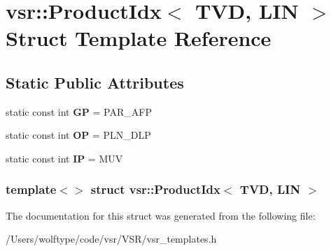 \hypertarget{structvsr_1_1_product_idx_3_01_t_v_d_00_01_l_i_n_01_4}{\section{vsr\-:\-:Product\-Idx$<$ T\-V\-D, L\-I\-N $>$ Struct Template Reference}
\label{structvsr_1_1_product_idx_3_01_t_v_d_00_01_l_i_n_01_4}
}
\subsection*{Static Public Attributes}
\begin{DoxyCompactItemize}
\item 
\hypertarget{structvsr_1_1_product_idx_3_01_t_v_d_00_01_l_i_n_01_4_a6b02df5757f8b860d906bdd7bb7ca5d2}{static const int {\bfseries G\-P} = P\-A\-R\-\_\-\-A\-F\-P}\label{structvsr_1_1_product_idx_3_01_t_v_d_00_01_l_i_n_01_4_a6b02df5757f8b860d906bdd7bb7ca5d2}

\item 
\hypertarget{structvsr_1_1_product_idx_3_01_t_v_d_00_01_l_i_n_01_4_a110243055e9d209b702a1c4c2aca1720}{static const int {\bfseries O\-P} = P\-L\-N\-\_\-\-D\-L\-P}\label{structvsr_1_1_product_idx_3_01_t_v_d_00_01_l_i_n_01_4_a110243055e9d209b702a1c4c2aca1720}

\item 
\hypertarget{structvsr_1_1_product_idx_3_01_t_v_d_00_01_l_i_n_01_4_a6bdd6b5a5593647b003c13ee40bee0a9}{static const int {\bfseries I\-P} = M\-U\-V}\label{structvsr_1_1_product_idx_3_01_t_v_d_00_01_l_i_n_01_4_a6bdd6b5a5593647b003c13ee40bee0a9}

\end{DoxyCompactItemize}
\subsubsection*{template$<$$>$ struct vsr\-::\-Product\-Idx$<$ T\-V\-D, L\-I\-N $>$}



The documentation for this struct was generated from the following file\-:\begin{DoxyCompactItemize}
\item 
/\-Users/wolftype/code/vsr/\-V\-S\-R/vsr\-\_\-templates.\-h\end{DoxyCompactItemize}
